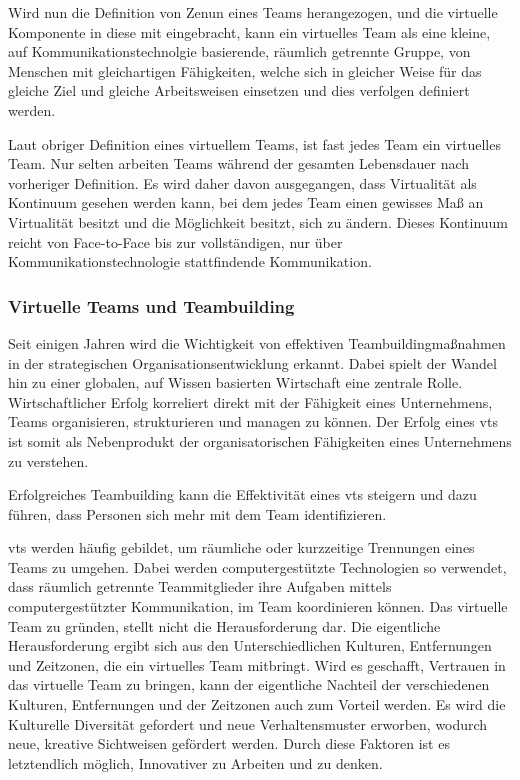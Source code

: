 \documentclass[a4paper,11pt]{article}%
\renewcommand{\\}{\vspace*{0.5\baselineskip} \newline}
\begin{document}
Wird nun die Definition von Zenun \citep[p.2]{zenun2007effects} eines Teams herangezogen, und die virtuelle Komponente in diese mit eingebracht, kann ein virtuelles Team als \\
\dq{}eine kleine, auf Kommunikationstechnolgie basierende, räumlich getrennte Gruppe, von Menschen mit gleichartigen Fähigkeiten, welche sich in gleicher Weise für das gleiche Ziel und gleiche Arbeitsweisen einsetzen und dies verfolgen\dq{} \\
definiert werden.

Laut obriger Definition eines virtuellem Teams, ist fast jedes Team ein virtuelles Team. Nur selten arbeiten Teams während der gesamten Lebensdauer nach vorheriger Definition. Es wird daher davon ausgegangen, dass Virtualität als Kontinuum gesehen werden kann, bei dem jedes Team einen gewisses Maß an Virtualität besitzt und die Möglichkeit besitzt, sich zu ändern. Dieses Kontinuum reicht von Face-to-Face bis zur vollständigen, nur über Kommunikationstechnologie stattfindende Kommunikation. \cite{martins2004virtual}


		\subsubsection{Virtuelle Teams und Teambuilding}

Seit einigen Jahren wird die Wichtigkeit von effektiven Teambuildingmaßnahmen in der strategischen Organisationsentwicklung erkannt. Dabei spielt der Wandel hin zu einer globalen, auf Wissen basierten Wirtschaft eine zentrale Rolle. \citep{belbin2011management} \citep[p.7]{katzenbach2015wisdom}
Wirtschaftlicher Erfolg korreliert direkt mit der Fähigkeit eines Unternehmens, Teams organisieren, strukturieren und managen zu können. \citep{pasmore1993designing}
Der Erfolg eines \ac{vts} ist somit als Nebenprodukt der organisatorischen Fähigkeiten eines Unternehmens zu verstehen. \citep[Chapter.5]{kling1994social}

Erfolgreiches Teambuilding kann die Effektivität eines \ac{vts} steigern und dazu führen, dass Personen sich mehr mit dem Team identifizieren. \citep{kaiser2000student}

\ac{vts} werden häufig gebildet, um räumliche oder kurzzeitige Trennungen eines Teams zu umgehen. Dabei werden computergestützte Technologien so verwendet, dass räumlich getrennte Teammitglieder ihre Aufgaben mittels computergestützter Kommunikation, im Team koordinieren können. \citep[p. 117-119]{peters2007identifying} \citep[p. 1-2]{cascio2003leadership}
Das virtuelle Team zu gründen, stellt nicht die Herausforderung dar. Die eigentliche Herausforderung ergibt sich aus den Unterschiedlichen Kulturen, Entfernungen und Zeitzonen, die ein virtuelles Team mitbringt. Wird es geschafft, Vertrauen in das virtuelle Team zu bringen, kann der eigentliche Nachteil der verschiedenen Kulturen, Entfernungen und der Zeitzonen auch zum Vorteil werden. Es wird die Kulturelle Diversität gefordert und neue Verhaltensmuster erworben, wodurch neue, kreative Sichtweisen gefördert werden. Durch diese Faktoren ist es letztendlich möglich, Innovativer zu Arbeiten und zu denken. \citep{dyer1995team} \citep[p.405-416]{milliken1996searching}
\end{document}
